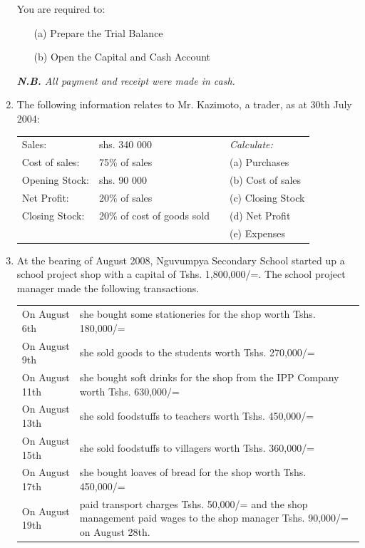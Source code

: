 \begin{enumerate}
You are required to:
\begin{itemize}
\item[(a)] Prepare the Trial Balance
\item[(b)] Open the Capital and Cash Account
\end{itemize}
\textit{\textbf{N.B.} All payment and receipt were made in cash.}


\item The following information relates to Mr. Kazimoto, a trader, as at 30th July 2004:\\

\begin{tabular}{l p{4cm} m{1cm} l}
Sales: & shs. 340 000 && \textit{Calculate:}\\
Cost of sales: & 75\% of sales && (a) Purchases\\
Opening Stock: & shs. 90 000 && (b) Cost of sales\\
Net Profit: & 20\% of sales & &(c) Closing Stock\\
Closing Stock: & 20\% of cost of goods sold && (d) Net Profit\\
 &  & &(e) Expenses\\
\end{tabular}



\item At the bearing of August 2008, Nguvumpya Secondary School started up a school project shop with a capital of Tshs. 1,800,000/=. The school project manager made the following transactions.\\

\begin{tabular}{l p{13cm}}
On August 6th & she bought some stationeries for the shop worth Tshs. 180,000/=\\
On August 9th & she sold goods to the students worth Tshs. 270,000/=\\
On August 11th & she bought soft drinks for the shop from the IPP Company worth Tshs. 630,000/=\\
On August 13th & she sold foodstuffs to teachers worth Tshs. 450,000/=\\
On August 15th & she sold foodstuffs to villagers worth Tshs. 360,000/=\\
On August 17th & she bought loaves of bread for the shop worth Tshs. 450,000/=\\
On August 19th & paid transport charges Tshs. 50,000/= and the shop management paid wages to the shop manager Tshs. 90,000/= on August 28th.
\end{tabular}


\end{enumerate}
